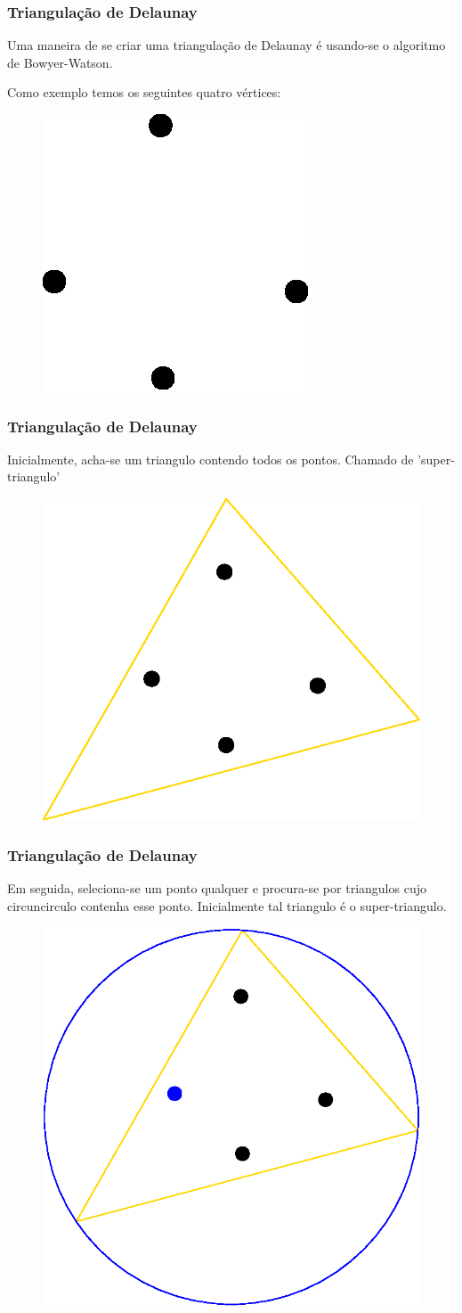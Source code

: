 \documentclass[brazil]{beamer}
\begin{document}
\begin{frame}
  \frametitle{Triangulação de Delaunay}

  Uma maneira de se criar uma triangulação de Delaunay é usando-se o algoritmo de Bowyer-Watson.

  Como exemplo temos os seguintes quatro vértices:

  \begin{figure}
    \includegraphics[width=0.3\linewidth]{dela4.eps}
  \end{figure}
\end{frame}


\begin{frame}
  \frametitle{Triangulação de Delaunay}

  Inicialmente, acha-se um triangulo contendo todos os pontos. Chamado de 'super-triangulo'


  \begin{figure}
    \includegraphics[width=0.5\linewidth]{dela5.eps}
  \end{figure}
\end{frame}

\begin{frame}
  \frametitle{Triangulação de Delaunay}

  Em seguida, seleciona-se um ponto qualquer e procura-se por triangulos cujo circuncirculo contenha esse ponto. Inicialmente tal triangulo é o super-triangulo.

  \begin{figure}
    \includegraphics[width=0.5\linewidth]{dela6.eps}
  \end{figure}
\end{frame}
\end{document}
